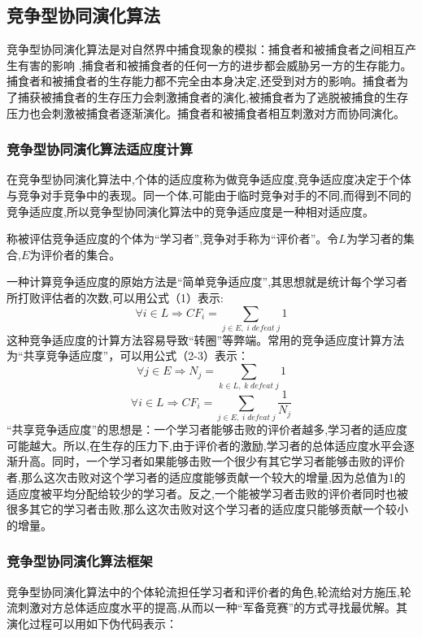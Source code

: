 \documentclass[a4paper]{article}
\begin{document}
    \subsection{竞争型协同演化算法}
    
    竞争型协同演化算法是对自然界中捕食现象的模拟：捕食者和被捕食者之间相互产生有害的影响 ,捕食者和被捕食者的任何一方的进步都会威胁另一方的生存能力。捕食者和被捕食者的生存能力都不完全由本身决定,还受到对方的影响\cite{li}。捕食者为了捕获被捕食者的生存压力会刺激捕食者的演化,被捕食者为了逃脱被捕食的生存压力也会刺激被捕食者逐渐演化。捕食者和被捕食者相互刺激对方而协同演化。

    \subsubsection{竞争型协同演化算法适应度计算}

    在竞争型协同演化算法中,个体的适应度称为做竞争适应度,竞争适应度决定于个体与竞争对手竞争中的表现。同一个体,可能由于临时竞争对手的不同,而得到不同的竞争适应度,所以竞争型协同演化算法中的竞争适应度是一种相对适应度。

    称被评估竞争适应度的个体为“学习者”,竞争对手称为“评价者”。令$L$为学习者的集合,$E$为评价者的集合。

    一种计算竞争适应度的原始方法是“简单竞争适应度”,其思想就是统计每个学习者所打败评估者的次数,可以用公式（1）表示:
    \begin{equation}
		\forall i \in L \Rightarrow CF_i = \sum_{j \in E,\;i\;defeat\;j}1
    \end{equation}
    这种竞争适应度的计算方法容易导致“转圈”等弊端。常用的竞争适应度计算方法为“共享竞争适应度”，可以用公式（2-3）表示：
    \begin{equation}
		\forall j \in E \Rightarrow N_j = \sum_{k \in L,\;k\;defeat\;j}1
    \end{equation}
    \begin{equation}
		\forall i \in L \Rightarrow CF_i = \sum_{j \in E,\;i\;defeat\;j}\frac{1}{N_j}
    \end{equation}
    “共享竞争适应度”的思想是：一个学习者能够击败的评价者越多,学习者的适应度可能越大。所以,在生存的压力下,由于评价者的激励,学习者的总体适应度水平会逐渐升高。同时，一个学习者如果能够击败一个很少有其它学习者能够击败的评价者,那么这次击败对这个学习者的适应度能够贡献一个较大的增量,因为总值为1的适应度被平均分配给较少的学习者。反之,一个能被学习者击败的评价者同时也被很多其它的学习者击败,那么这次击败对这个学习者的适应度只能够贡献一个较小的增量。

    \subsubsection{竞争型协同演化算法框架}
    竞争型协同演化算法中的个体轮流担任学习者和评价者的角色,轮流给对方施压,轮流刺激对方总体适应度水平的提高,从而以一种“军备竞赛”的方式寻找最优解。其演化过程可以用如下伪代码表示：
\end{document}
